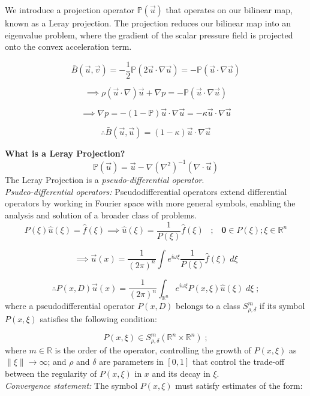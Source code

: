 \documentclass[12pt]{article}
\begin{document}
We introduce a projection operator $\mathbb{P}(\vec u)$ that operates on our bilinear map, known as a Leray projection. The projection reduces our bilinear map into an eigenvalue problem, where the gradient of the scalar pressure field is projected onto the convex acceleration term. 

\[\bar B(\vec u, \vec v) = -\frac{1}{2} \mathbb{P}(2 \vec u \cdot\nabla\vec u ) = - \mathbb{P}(\vec u \cdot \nabla \vec u)\]

\[\implies \rho(\vec{u}\cdot\nabla)\vec{u} + \nabla p = - \mathbb{P} (\vec u \cdot \nabla \vec u)\]

\[\implies \nabla p = - (1 - \mathbb{P}) \vec u \cdot \nabla \vec u = -\kappa \vec u \cdot \nabla \vec u \]

\[\therefore \bar B (\vec u, \vec u) = (1-\kappa) \vec u \cdot \nabla \vec u \] 

\textbf{What is a Leray Projection? }
\[\mathbb{P} (\vec u) = \vec u - \nabla (\nabla^{2})^{-1} (\nabla \cdot \vec u)\] 
The Leray Projection is a \textit{pseudo-differential operator}. \\ 

\textit{Psudeo-differential operators: } Pseudodifferential operators extend differential operators by working in Fourier space with more general symbols, enabling the analysis and solution of a broader class of problems.\\ 
\[P(\xi) \hat u(\xi) = \hat f (\xi) \implies \hat u (\xi) = \frac{1}{P(\xi)} \hat f (\xi)\;\;\;;\;\;\; \mathbf{0} \in P(\xi); \xi \in \mathbb{R}^{n} \]

\[\implies \vec u (x) = \frac{1}{(2\pi)^{n}} \int e^{i\omega\xi} \frac{1}{P(\xi)} \hat f (\xi) \;d\xi\] 

\[\therefore P(x,D) \vec u (x) = \frac{1}{(2\pi)^{n}} \int_{\mathbb{R}^{n}} e^{i\omega\xi} P(x, \xi) \hat u (\xi) \;d\xi \; ;\] 
where a pseudodifferential operator $P(x,D)$ belongs to a class $S^{m}_{\rho, \delta}$ if its symbol $P(x, \xi)$ satisfies the following condition: 

\[
P(x, \xi) \in S^{m}_{\rho, \delta} (\mathbb{R}^{n} \times \mathbb{R}^{n}) \;; 
\]
where $m \in \mathbb{R}$ is the order of the operator, controlling the growth of $P(x,\xi)$ as $\|\xi\| \to \infty$; and $\rho$ and $\delta$ are parameters in $[0,1]$ that control the trade-off between the regularity of $P(x,\xi)$ in $x$ and its decay in $\xi$.\\

\textit{Convergence statement: } The symbol $P(x,\xi)$ must satisfy estimates of the form:
\end{document}
